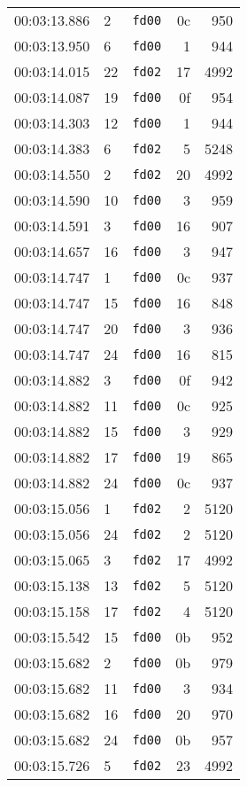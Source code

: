 \documentclass{article}
\begin{document}
\begin{longtable}{lllrr}
00:03:13.886 & 2 & \texttt{fd00} & 0c & 950 \\
00:03:13.950 & 6 & \texttt{fd00} & 1 & 944 \\
00:03:14.015 & 22 & \texttt{fd02} & 17 & 4992 \\
00:03:14.087 & 19 & \texttt{fd00} & 0f & 954 \\
00:03:14.303 & 12 & \texttt{fd00} & 1 & 944 \\
00:03:14.383 & 6 & \texttt{fd02} & 5 & 5248 \\
00:03:14.550 & 2 & \texttt{fd02} & 20 & 4992 \\
00:03:14.590 & 10 & \texttt{fd00} & 3 & 959 \\
00:03:14.591 & 3 & \texttt{fd00} & 16 & 907 \\
00:03:14.657 & 16 & \texttt{fd00} & 3 & 947 \\
00:03:14.747 & 1 & \texttt{fd00} & 0c & 937 \\
00:03:14.747 & 15 & \texttt{fd00} & 16 & 848 \\
00:03:14.747 & 20 & \texttt{fd00} & 3 & 936 \\
00:03:14.747 & 24 & \texttt{fd00} & 16 & 815 \\
00:03:14.882 & 3 & \texttt{fd00} & 0f & 942 \\
00:03:14.882 & 11 & \texttt{fd00} & 0c & 925 \\
00:03:14.882 & 15 & \texttt{fd00} & 3 & 929 \\
00:03:14.882 & 17 & \texttt{fd00} & 19 & 865 \\
00:03:14.882 & 24 & \texttt{fd00} & 0c & 937 \\
00:03:15.056 & 1 & \texttt{fd02} & 2 & 5120 \\
00:03:15.056 & 24 & \texttt{fd02} & 2 & 5120 \\
00:03:15.065 & 3 & \texttt{fd02} & 17 & 4992 \\
00:03:15.138 & 13 & \texttt{fd02} & 5 & 5120 \\
00:03:15.158 & 17 & \texttt{fd02} & 4 & 5120 \\
00:03:15.542 & 15 & \texttt{fd00} & 0b & 952 \\
00:03:15.682 & 2 & \texttt{fd00} & 0b & 979 \\
00:03:15.682 & 11 & \texttt{fd00} & 3 & 934 \\
00:03:15.682 & 16 & \texttt{fd00} & 20 & 970 \\
00:03:15.682 & 24 & \texttt{fd00} & 0b & 957 \\
00:03:15.726 & 5 & \texttt{fd02} & 23 & 4992 \\

\end{longtable}
\end{document}
